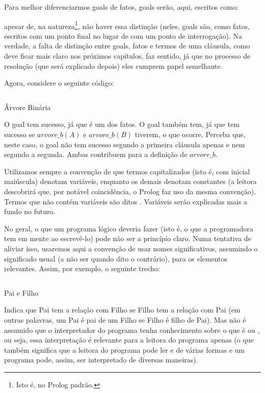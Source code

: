 \documentclass{article}
\begin{document}
Para melhor diferenciarmos goals de fatos, goals serão, aqui, escritos
como: 

\noindent apesar de, na natureza\footnote{Isto é, no Prolog padrão.},
não haver essa distinção (neles, goals são, como fatos, escritos com
um ponto final no lugar de com um ponto de interrogação). Na verdade,
a falta de distinção entre goals, fatos e termos de uma cláusula, como
deve ficar mais claro nos próximos capítulos, faz sentido, já que no
processo de resolução (que será explicado depois) eles cumprem papel
semelhante.

Agora, considere o seguinte código:\\

\begin{listing}
  \inputminted{prolog}{../Exemplos/Cap0/prog3_arvb.pl}
  \caption{Árvore Binária}\label{lst:arvb}
\end{listing}

O goal  tem sucesso, já que é um dos
fatos. O goal  também
tem, já que  tem sucesso se
$arvore\_b(A)$ e $arvore\_b(B)$ tiverem, o que ocorre. Perceba que,
neste caso, o goal não tem sucesso segundo a primeira cláusula apenas
e nem segundo a segunda. Ambas contribuem para a definição de
$arvore\_b$.

Utilizamos sempre a convenção de que termos capitalizados (isto é, com
inicial maiúscula) denotam variáveis, enquanto os demais denotam
constantes (a leitora descobrirá que, por notável coincidência, o
Prolog faz uso da mesma convenção). Termos que não contém variáveis
são ditos . Variáveis serão explicadas mais a
fundo no futuro.

No geral, o que um programa lógico deveria fazer (isto é, o que a
programadora tem em mente ao escrevê-lo) pode não ser a princípio
claro. Numa tentativa de aliviar isso, usaremos aqui a convenção de
usar nomes significativos, assumindo o significado usual (a não ser
quando dito o contrário), para os elementos relevantes. Assim, por
exemplo, o seguinte trecho:

\begin{listing}
  \inputminted{prolog}{../Exemplos/Cap0/prog4_pai.pl}
  \caption{Pai e Filho}\label{lst:pai_filho}
\end{listing}


Indica que Pai tem a relação  com Filho se Filho tem a
relação  com Pai (em outras palavras, um Pai é pai de
um Filho se Filho é filho de Pai). Mas não é assumido que o
interpretador do programa tenha conhecimento sobre o que é
 ou , ou seja, essa interpretação é
relevante para a leitora do programa apenas (o que também significa
que a leitora do programa pode ler  e 
de várias formas e um programa pode, assim, ser interpretado de
diversas maneiras).
\end{document}
